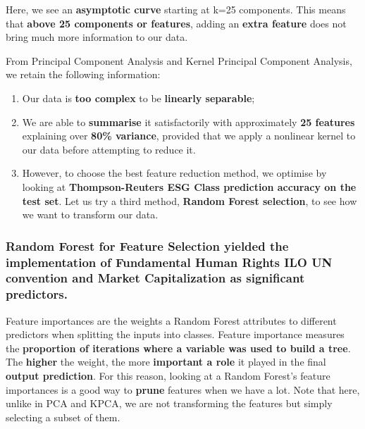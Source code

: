 \documentclass[12pt]{report}
\begin{document}
Here, we see an \textbf{asymptotic curve} starting at k=25 components. This means that \textbf{above 25 components or features}, adding an \textbf{extra feature} does not bring much more information to our data.

From Principal Component Analysis and Kernel Principal Component Analysis, we retain the following information:
\begin{enumerate}
    \item Our data is \textbf{too complex} to be \textbf{linearly separable};
    \item We are able to \textbf{summarise} it satisfactorily with approximately \textbf{25 features} explaining over \textbf{80\% variance}, provided that we apply a nonlinear kernel to our data before attempting to reduce it.
    \item However, to choose the best feature reduction method, we optimise by looking at \textbf{Thompson-Reuters ESG Class prediction accuracy on the test set}. Let us try a third method, \textbf{Random Forest selection}, to see how we want to transform our data. 
\end{enumerate}


\subsubsection{Random Forest for Feature Selection yielded the implementation of Fundamental Human Rights ILO UN convention and Market Capitalization as significant predictors.}
Feature importances are the weights a Random Forest attributes to different predictors when splitting the inputs into classes. Feature importance measures the \textbf{proportion of iterations where a variable was used to build a tree}. The \textbf{higher} the weight, the more \textbf{important a role} it played in the final \textbf{output prediction}. For this reason, looking at a Random Forest's feature importances is a good way to \textbf{prune} features when we have a lot. Note that here, unlike in PCA and KPCA, we are not transforming the features but simply selecting a subset of them. \newline 
\end{document}
